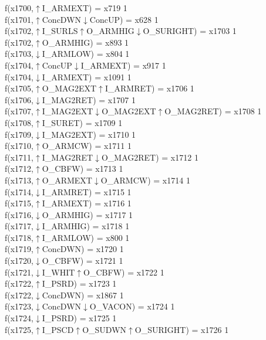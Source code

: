 f(x1700,$\uparrow$I\_ARMEXT) = x719 {1} \\
f(x1701,$\uparrow$ConcDWN$\downarrow$ConcUP) = x628 {1} \\
f(x1702,$\uparrow$I\_SURLS$\uparrow$O\_ARMHIG$\downarrow$O\_SURIGHT) = x1703 {1} \\
f(x1702,$\uparrow$O\_ARMHIG) = x893 {1} \\
f(x1703,$\downarrow$I\_ARMLOW) = x804 {1} \\
f(x1704,$\uparrow$ConcUP$\downarrow$I\_ARMEXT) = x917 {1} \\
f(x1704,$\downarrow$I\_ARMEXT) = x1091 {1} \\
f(x1705,$\uparrow$O\_MAG2EXT$\uparrow$I\_ARMRET) = x1706 {1} \\
f(x1706,$\downarrow$I\_MAG2RET) = x1707 {1} \\
f(x1707,$\uparrow$I\_MAG2EXT$\downarrow$O\_MAG2EXT$\uparrow$O\_MAG2RET) = x1708 {1} \\
f(x1708,$\uparrow$I\_SURET) = x1709 {1} \\
f(x1709,$\downarrow$I\_MAG2EXT) = x1710 {1} \\
f(x1710,$\uparrow$O\_ARMCW) = x1711 {1} \\
f(x1711,$\uparrow$I\_MAG2RET$\downarrow$O\_MAG2RET) = x1712 {1} \\
f(x1712,$\uparrow$O\_CBFW) = x1713 {1} \\
f(x1713,$\uparrow$O\_ARMEXT$\downarrow$O\_ARMCW) = x1714 {1} \\
f(x1714,$\downarrow$I\_ARMRET) = x1715 {1} \\
f(x1715,$\uparrow$I\_ARMEXT) = x1716 {1} \\
f(x1716,$\downarrow$O\_ARMHIG) = x1717 {1} \\
f(x1717,$\downarrow$I\_ARMHIG) = x1718 {1} \\
f(x1718,$\uparrow$I\_ARMLOW) = x800 {1} \\
f(x1719,$\uparrow$ConcDWN) = x1720 {1} \\
f(x1720,$\downarrow$O\_CBFW) = x1721 {1} \\
f(x1721,$\downarrow$I\_WHIT$\uparrow$O\_CBFW) = x1722 {1} \\
f(x1722,$\uparrow$I\_PSRD) = x1723 {1} \\
f(x1722,$\downarrow$ConcDWN) = x1867 {1} \\
f(x1723,$\downarrow$ConcDWN$\downarrow$O\_VACON) = x1724 {1} \\
f(x1724,$\downarrow$I\_PSRD) = x1725 {1} \\
f(x1725,$\uparrow$I\_PSCD$\uparrow$O\_SUDWN$\uparrow$O\_SURIGHT) = x1726 {1} \\
